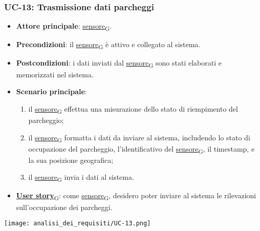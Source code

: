 \newpage
\subsubsection{UC-13: Trasmissione dati parcheggi}
\begin{itemize}
	\item \textbf{Attore principale}: \href{https://7last.github.io/docs/pb/documentazione-interna/glossario\#sensore}{sensore\textsubscript{G}}.
	\item \textbf{Precondizioni}: il \href{https://7last.github.io/docs/pb/documentazione-interna/glossario\#sensore}{sensore\textsubscript{G}} è attivo e collegato al sistema.
	\item \textbf{Postcondizioni}: i dati inviati dal \href{https://7last.github.io/docs/pb/documentazione-interna/glossario\#sensore}{sensore\textsubscript{G}} sono stati elaborati e memorizzati nel sistema.
	\item \textbf{Scenario principale}:
	      \begin{enumerate}
		      \item il \href{https://7last.github.io/docs/pb/documentazione-interna/glossario\#sensore}{sensore\textsubscript{G}} effettua una misurazione dello stato di riempimento del parcheggio;
		      \item il \href{https://7last.github.io/docs/pb/documentazione-interna/glossario\#sensore}{sensore\textsubscript{G}} formatta i dati da inviare al sistema, includendo lo stato di occupazione del parcheggio, l'identificativo del \href{https://7last.github.io/docs/pb/documentazione-interna/glossario\#sensore}{sensore\textsubscript{G}},
		            il timestamp, e la sua posizione geografica;
		      \item il \href{https://7last.github.io/docs/pb/documentazione-interna/glossario\#sensore}{sensore\textsubscript{G}} invia i dati al sistema.
	      \end{enumerate}
	\item \href{https://7last.github.io/docs/pb/documentazione-interna/glossario\#user-story}{\textbf{User story}\textsubscript{G}}:
	      come \href{https://7last.github.io/docs/pb/documentazione-interna/glossario\#sensore}{sensore\textsubscript{G}}, desidero poter inviare al sistema le rilevazioni sull'occupazione dei parcheggi.
\end{itemize}
\begin{center}
	\texttt{[image: analisi\_dei\_requisiti/UC-13.png]}
\end{center}

